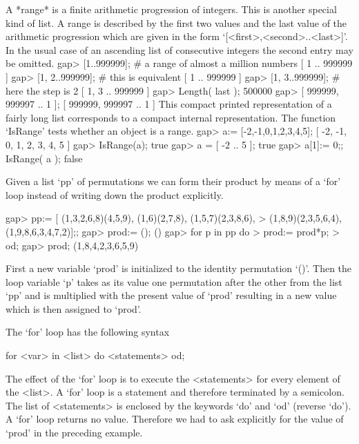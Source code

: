 A *range* is a finite arithmetic progression of integers. This is another
special kind of list. A range is described by the first two values and the last
value of the arithmetic progression which are given in the form
`[<first>,<second>..<last>]'.
In the usual case of an ascending list of
consecutive integers the second entry may be omitted.
\beginexample
gap> [1..999999];     #  a range of almost a million numbers
[ 1 .. 999999 ]
gap> [1, 2..999999];  #  this is equivalent
[ 1 .. 999999 ]
gap> [1, 3..999999];  #  here the step is 2
[ 1, 3 .. 999999 ]
gap> Length( last );
500000
gap> [ 999999, 999997 .. 1 ];
[ 999999, 999997 .. 1 ]
\endexample
This compact printed representation of a fairly long  list corresponds to
a  compact internal representation.  The function `IsRange' tests whether
an object is a range.
\beginexample
gap> a:= [-2,-1,0,1,2,3,4,5];
[ -2, -1, 0, 1, 2, 3, 4, 5 ]
gap> IsRange(a);
true
gap> a = [ -2 .. 5 ];
true
gap> a[1]:= 0;; IsRange( a );
false
\endexample



%

Given a list `pp' of permutations we can form their product by means of a
`for' loop instead of writing down the product explicitly.

\beginexample
gap> pp:= [ (1,3,2,6,8)(4,5,9), (1,6)(2,7,8), (1,5,7)(2,3,8,6),
>           (1,8,9)(2,3,5,6,4), (1,9,8,6,3,4,7,2)];;
gap> prod:= ();        
()
gap> for p in pp do
>       prod:= prod*p;    
>    od;
gap> prod;        
(1,8,4,2,3,6,5,9)
\endexample

First a  new variable `prod'  is initialized  to the identity permutation
`()'. Then the loop variable `p' takes as its value one permutation after
the other from the list `pp' and is multiplied with  the present value of
`prod'  resulting in a  new value which  is then assigned  to `prod'.

The `for' loop has the following syntax

\)\fmark for <var> in <list> do <statements> od;

The  effect of the `for'  loop  is to execute the <statements> for  every
element  of  the <list>.   A `for'  loop  is  a  statement  and therefore
terminated by a semicolon.  The list of <statements>  is enclosed by  the
keywords `do' and `od'  (reverse  `do').  A `for'  loop returns no value.
Therefore we had to ask explicitly for the value of `prod' in the
preceding example.

